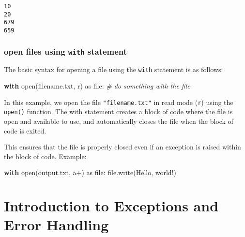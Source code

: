 \documentclass[11pt]{article}
\newenvironment{Shaded}{}{}
\newcommand{\StringTok}[1]{\textcolor[rgb]{0.25,0.44,0.63}{{#1}}}
\newcommand{\CommentTok}[1]{\textcolor[rgb]{0.38,0.63,0.69}{\textit{{#1}}}}
\newcommand{\NormalTok}[1]{{#1}}
\newcommand{\ImportTok}[1]{{#1}}
\newcommand{\ControlFlowTok}[1]{\textcolor[rgb]{0.00,0.44,0.13}{\textbf{{#1}}}}
\newcommand{\BuiltInTok}[1]{{#1}}
\begin{document}
    \begin{Verbatim}[commandchars=\\\{\}]
10
20
679
659
    \end{Verbatim}

    \hypertarget{open-files-using-with-statement}{%
\subsubsection{\texorpdfstring{open files using \texttt{with}
statement}{open files using with statement}}\label{open-files-using-with-statement}}

The basic syntax for opening a file using the \texttt{with} statement is
as follows:

\begin{Shaded}
\begin{Highlighting}[]
\ControlFlowTok{with} \BuiltInTok{open}\NormalTok{(}\StringTok{\textquotesingle{}filename.txt\textquotesingle{}}\NormalTok{, }\StringTok{\textquotesingle{}r\textquotesingle{}}\NormalTok{) }\ImportTok{as} \BuiltInTok{file}\NormalTok{:}
    \CommentTok{\# do something with the file}
\end{Highlighting}
\end{Shaded}

In this example, we open the file \texttt{"filename.txt"} in read mode
(\texttt{\textquotesingle{}r\textquotesingle{}}) using the
\texttt{open()} function. The with statement creates a block of code
where the file is open and available to use, and automatically closes
the file when the block of code is exited.

This ensures that the file is properly closed even if an exception is
raised within the block of code. Example:

\begin{Shaded}
\begin{Highlighting}[]
\ControlFlowTok{with} \BuiltInTok{open}\NormalTok{(}\StringTok{\textquotesingle{}output.txt\textquotesingle{}}\NormalTok{, }\StringTok{\textquotesingle{}a+\textquotesingle{}}\NormalTok{) }\ImportTok{as} \BuiltInTok{file}\NormalTok{:}
    \BuiltInTok{file}\NormalTok{.write(}\StringTok{\textquotesingle{}Hello, world!\textquotesingle{}}\NormalTok{)}
\end{Highlighting}
\end{Shaded}

\hypertarget{introduction-to-exceptions-and-error-handling}{%
\section{Introduction to Exceptions and Error
Handling}\label{introduction-to-exceptions-and-error-handling}}
\end{document}
